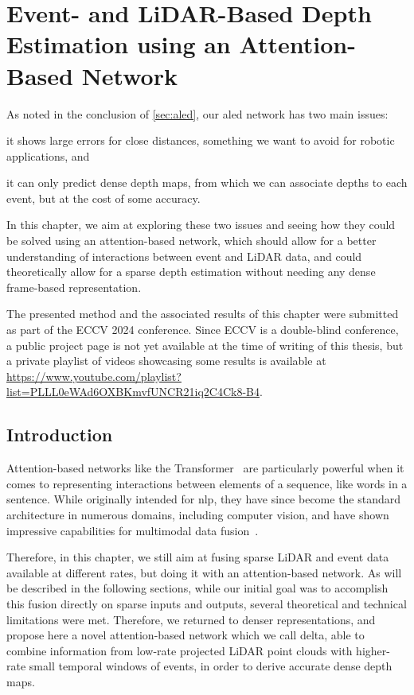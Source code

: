 \chapter{Event- and LiDAR-Based Depth Estimation using an Attention-Based Network}\label{sec:delta}

As noted in the conclusion of \cref{sec:aled}, our \acrshort{aled} network has two main issues:
\begin{enumerate*}[label=\textbf{(\arabic*)}]
  \item it shows large errors for close distances, something we want to avoid for robotic applications, and
  \item it can only predict dense depth maps, from which we can associate depths to each event, but at the cost of some accuracy. 
\end{enumerate*}
In this chapter, we aim at exploring these two issues and seeing how they could be solved using an attention-based network, which should allow for a better understanding of interactions between event and LiDAR data, and could theoretically allow for a sparse depth estimation without needing any dense frame-based representation.

The presented method and the associated results of this chapter were submitted as part of the ECCV 2024 conference. Since ECCV is a double-blind conference, a public project page is not yet available at the time of writing of this thesis, but a private playlist of videos showcasing some results is available at \url{https://www.youtube.com/playlist?list=PLLL0eWAd6OXBKmvfUNCR21iq2C4Ck8-B4}.

\section{Introduction}
Attention-based networks like the Transformer~\cite{Vaswani2017AttentionIA} are particularly powerful when it comes to representing interactions between elements of a sequence, like words in a sentence. While originally intended for \acrfull{nlp}, they have since become the standard architecture in numerous domains, including computer vision, and have shown impressive capabilities for multimodal data fusion~\cite{Prakash2021MultiModalFT,Chitta2022TransFuserIW}.

Therefore, in this chapter, we still aim at fusing sparse LiDAR and event data available at different rates, but doing it with an attention-based network. As will be described in the following sections, while our initial goal was to accomplish this fusion directly on sparse inputs and outputs, several theoretical and technical limitations were met. Therefore, we returned to denser representations, and propose here a novel attention-based network which we call \acrshort{delta}, able to combine information from low-rate projected LiDAR point clouds with higher-rate small temporal windows of events, in order to derive accurate dense depth maps.

